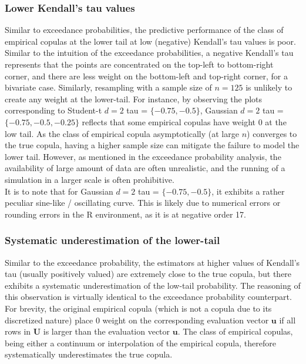 \documentclass[12pt]{report}
\newcommand{\1}{\mathbf{1}}
\begin{document}
\begin{flushleft}
\subsubsection{Lower Kendall's tau values}
Similar to exceedance probabilities, the predictive performance of the class of empirical copulas at the lower tail at low (negative) Kendall's tau values is poor. Similar to the intuition of the exceedance probabilities, a negative Kendall's tau represents that the points are concentrated on the top-left to bottom-right corner, and there are less weight on the bottom-left and top-right corner, for a bivariate case. Similarly, resampling with a sample size of $n = 125$ is unlikely to create any weight at the lower-tail. For instance, by observing the plots corresponding to Student-t $d = 2$ tau = $\{ -0.75, -0.5 \}$, Gaussian $d = 2$ tau = $\{-0.75, -0.5, -0.25\}$ reflects that some empirical copulas have weight 0 at the low tail. As the class of empirical copula asymptotically (at large $n$) converges to the true copula, having a higher sample size can mitigate the failure to model the lower tail. However, as mentioned in the exceedance probability analysis, the availability of large amount of data are often unrealistic, and the running of a simulation in a larger scale is often prohibitive.\\
\vspace{0.5cm}
It is to note that for Gaussian $d = 2$ tau = $\{-0.75, -0.5\}$, it exhibits a rather peculiar sine-like / oscillating curve. This is likely due to numerical errors or rounding errors in the R environment, as it is at negative order 17.
\subsubsection{Systematic underestimation of the lower-tail}
Similar to the exceedance probability, the estimators at higher values of Kendall's tau (usually positively valued) are extremely close to the true copula, but there exhibits a systematic underestimation of the low-tail probability. The reasoning of this observation is virtually identical to the exceedance probability counterpart. For brevity, the original empirical copula (which is not a copula due to its discretized nature) place 0 weight on the corresponding evaluation vector $\textbf{u}$ if all rows in $\textbf{U}$ is larger than the evaluation vector $\textbf{u}$. The class of empirical copulas, being either a continuum or interpolation of the empirical copula, therefore systematically underestimates the true copula. \\

\end{flushleft}
\end{document}
